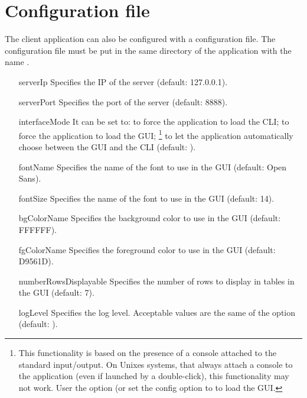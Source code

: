 \section{Configuration file}

The client application can also be configured with a configuration file. The
configuration file must be put in the same directory of the application with the
name .



\begin{itemize}
	\item[serverIp] Specifies the IP of the server (default: 127.0.0.1).
	\item[serverPort] Specifies the port of the server (default: 8888).
	\item[interfaceMode] It can be set to:  to force the
		application to load the CLI;  to force the
		application to load the GUI; \footnote{This
		functionality is based on the presence of a console attached to
		the standard input/output. On Unixes systems, that always attach
		a console to the application (even if launched by a
		double-click), this functionality may not work. User the
		 option (or set the config option to
		 to load the GUI.} to let the application
		automatically choose between the GUI and the CLI (default: ).
	\item[fontName] Specifies the name of the font to use in the GUI
		(default: Open Sans).
	\item[fontSize] Specifies the name of the font to use in the GUI
		(default: 14).
	\item[bgColorName] Specifies the background color to use in the GUI
		(default: FFFFFF).
	\item[fgColorName] Specifies the foreground color to use in the GUI
		(default: D9561D).
	\item[numberRowsDisplayable] Specifies the number of rows to display in
		tables in the GUI (default: 7).
	\item[logLevel] Specifies the log level. Acceptable values are the same
		of the  option (default: ).
\end{itemize}
